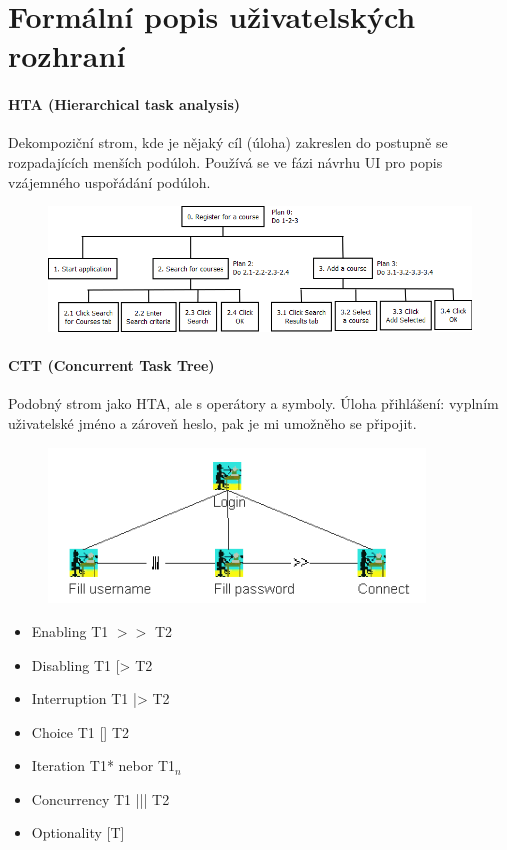 \section[NUR - Formální popis uživatelských rozhraní]{Formální popis uživatelských rozhraní}

\paragraph{HTA (Hierarchical task analysis)} Dekompoziční strom, kde je nějaký cíl (úloha) zakreslen do postupně se rozpadajících menších podúloh. Používá se ve fázi návrhu UI pro popis vzájemného uspořádání podúloh.

\begin{figure}[h]
\centering
\includegraphics[width=130mm]{05/images/hta}
\end{figure}

\paragraph{CTT (Concurrent Task Tree)} Podobný strom jako HTA, ale s operátory a symboly. Úloha přihlášení: vyplním uživatelské jméno a zároveň heslo, pak je mi umožněho se připojit.

\begin{figure}[h]
\centering
\includegraphics[width=100mm]{05/images/ctt}
\end{figure}
\vspace{-15px}
\begin{itemize}[itemsep=0px]
\item Enabling T1 $>>$ T2
\item Disabling T1 [> T2
\item Interruption T1 |> T2
\item Choice T1 [] T2
\item Iteration T1* nebor T1$_{n}$
\item Concurrency T1 ||| T2
\item Optionality [T]
\end{itemize}


